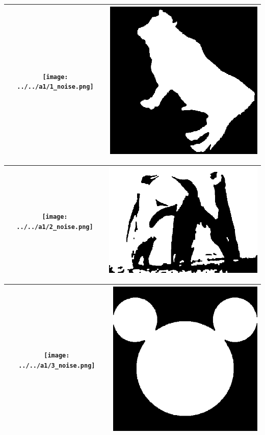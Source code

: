 \documentclass{article}
\begin{document}
\label{results_1}

\begin{center}
 \begin{tabular}{||c c||}
 \hline

 \texttt{[image: ../../a1/1\_noise.png]} & \includegraphics[width=.4\linewidth]{../image-denoising/output/1_denoise.png} \\ 
 \hline
 \end{tabular}
\end{center}

\begin{center}
 \begin{tabular}{||c c||}
 \hline
 \texttt{[image: ../../a1/2\_noise.png]} & \includegraphics[width=.4\linewidth]{../image-denoising/output/2_denoise.png} \\ 
 \hline
  \end{tabular}
\end{center}

\begin{center}
 \begin{tabular}{||c c||}
 \hline
 \texttt{[image: ../../a1/3\_noise.png]} & \includegraphics[width=.4\linewidth]{../image-denoising/output/3_denoise.png} \\ 
 \hline
  \end{tabular}
\end{center}
\end{document}
